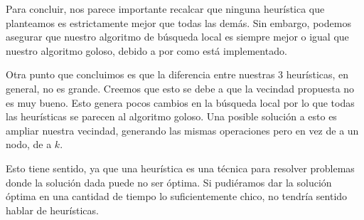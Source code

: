 Para concluir, nos parece importante recalcar que ninguna heurística que planteamos es estrictamente mejor que todas las demás. Sin embargo, podemos asegurar que nuestro algoritmo de búsqueda local es siempre mejor o igual que nuestro algoritmo goloso, debido a por como está implementado. 

Otra punto que concluimos es que la diferencia entre nuestras 3 heurísticas, en general, no es grande. Creemos que esto se debe a que la vecindad propuesta no es muy bueno. Esto genera pocos cambios en la búsqueda local por lo que todas las heurísticas se parecen al algoritmo goloso. Una posible solución a esto es ampliar nuestra vecindad, generando las mismas operaciones pero en vez de a un nodo, de a $k$.

Esto tiene sentido, ya que una heurística es una técnica para resolver problemas donde la solución dada puede no ser óptima. Si pudiéramos dar la solución óptima	 en una cantidad de tiempo lo suficientemente chico, no tendría sentido hablar de heurísticas.